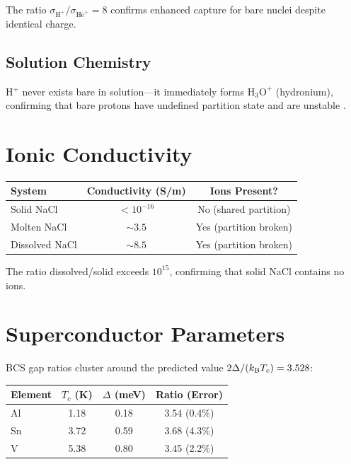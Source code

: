 The ratio $\sigma_{\mathrm{H}^+}/\sigma_{\mathrm{He}^+} = 8$ confirms enhanced capture for bare nuclei despite identical charge.

\subsection{Solution Chemistry}

H$^+$ never exists bare in solution---it immediately forms $\mathrm{H_3O}^+$ (hydronium), confirming that bare protons have undefined partition state and are unstable \cite{marx2006}.

\section{Ionic Conductivity}
\label{sec:val_conductivity}

\begin{center}
\begin{tabular}{lcc}
\toprule
System & Conductivity (S/m) & Ions Present? \\
\midrule
Solid NaCl & $<10^{-16}$ & No (shared partition) \\
Molten NaCl & $\sim 3.5$ & Yes (partition broken) \\
Dissolved NaCl & $\sim 8.5$ & Yes (partition broken) \\
\bottomrule
\end{tabular}
\end{center}

The ratio dissolved/solid exceeds $10^{15}$, confirming that solid NaCl contains no ions.

\section{Superconductor Parameters}
\label{sec:val_super}

BCS gap ratios cluster around the predicted value $2\Delta/(k_{\mathrm{B}} T_c) = 3.528$:

\begin{center}
\begin{tabular}{lccc}
\toprule
Element & $T_c$ (K) & $\Delta$ (meV) & Ratio (Error) \\
\midrule
Al & 1.18 & 0.18 & 3.54 (0.4\%) \\
Sn & 3.72 & 0.59 & 3.68 (4.3\%) \\
V & 5.38 & 0.80 & 3.45 (2.2\%) \\
\bottomrule
\end{tabular}
\end{center}

